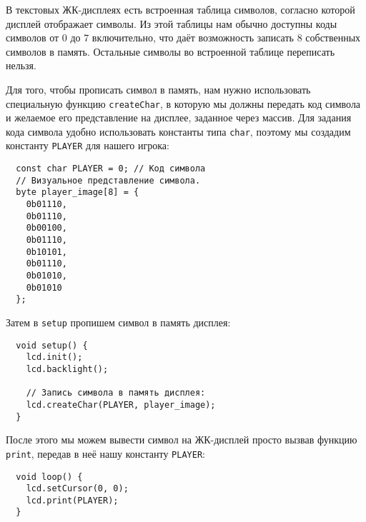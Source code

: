 \documentclass[../sparc.tex]{subfiles}
\begin{document}
В текстовых ЖК-дисплеях есть встроенная таблица символов, согласно которой
дисплей отображает символы.  Из этой таблицы нам обычно доступны коды символов
от 0 до 7 включительно, что даёт возможность записать 8 собственных символов в
память.  Остальные символы во встроенной таблице переписать нельзя.

Для того, чтобы прописать символ в память, нам нужно использовать специальную
функцию \texttt{createChar}, в которую мы должны передать код символа и желаемое
его представление на дисплее, заданное через массив.  Для задания кода символа
удобно использовать константы типа \texttt{char}, поэтому мы создадим константу
\texttt{PLAYER} для нашего игрока:

\begin{verbatim}
  const char PLAYER = 0; // Код символа
  // Визуальное представление символа.
  byte player_image[8] = {
    0b01110,
    0b01110,
    0b00100,
    0b01110,
    0b10101,
    0b01110,
    0b01010,
    0b01010
  };
\end{verbatim}

Затем в \texttt{setup} пропишем символ в память дисплея:

\begin{verbatim}
  void setup() {
    lcd.init();
    lcd.backlight();

    // Запись символа в память дисплея:
    lcd.createChar(PLAYER, player_image);
  }
\end{verbatim}

После этого мы можем вывести символ на ЖК-дисплей просто вызвав функцию
\texttt{print}, передав в неё нашу константу \texttt{PLAYER}:

\begin{verbatim}
  void loop() {
    lcd.setCursor(0, 0);
    lcd.print(PLAYER);
  }
\end{verbatim}
\end{document}
